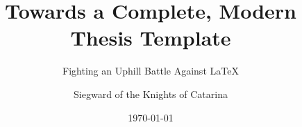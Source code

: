 \documentclass[parskip=half]{scrbook}
\title{Towards a Complete, Modern Thesis Template}
\subtitle{Fighting an Uphill Battle Against \LaTeX}
\author{Siegward of the Knights of Catarina}
\date{\today}
\providecommand{\listoflistings}{\lstlistoflistings}
\begin{document}
\frontmatter
\maketitle

\tableofcontents
\listoffigures
\listoftables
\listofalgorithms
\listoflistings


\mainmatter



\backmatter
\appendix

\printglossaries

\end{document}
